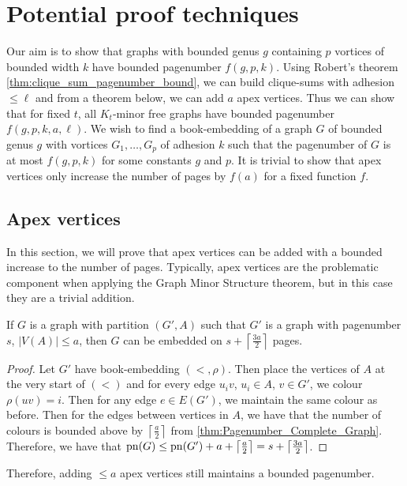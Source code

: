 
\chapter{Potential proof techniques}\label{chap:Proving_The_Theorem}
Our aim is to show that graphs with bounded genus \(g\) containing \(p\) vortices of bounded width \(k\) have bounded pagenumber \(f(g, p, k)\).
Using Robert's theorem \cref{thm:clique_sum_pagenumber_bound}, we can build clique-sums with adhesion \(\leq \ell\) and from a theorem below, we can add \(a\) apex vertices. 
Thus we can show that for fixed \(t\), all \(K_t\)-minor free graphs have bounded pagenumber \(f(g, p, k, a, \ell)\). 
We wish to find a book-embedding of a graph \(G\) of bounded genus \(g\) with vortices \(G_1, \ldots, G_p\) of adhesion \(k\) such that the pagenumber of \(G\) is at most \(f(g, p, k)\) for some constants \(g\) and \(p\). It is trivial to show that apex vertices only increase the number of pages by \(f(a)\) for a fixed function \(f\). 
\section{Apex vertices}
In this section, we will prove that apex vertices can be added with a bounded increase to the number of pages. Typically, apex vertices are the problematic component when applying the Graph Minor Structure theorem, but in this case they are a trivial addition.
\begin{theorem}\label{thm:apex_vertices_pagenumber}
	If \(G\) is a graph with partition \((G', A)\) such that \(G'\) is a graph with pagenumber \(s\), \(|V(A)| \leq a\), then \(G\) can be embedded on \(s + \left\lceil \frac{3a}{2}\right\rceil\) pages. 
\end{theorem}
\begin{proof}
	Let \(G'\) have book-embedding \((<, \rho)\). Then place the vertices of \(A\) at the very start of \((<)\) and for every edge \(u_i v \), \(u_i \in A\), \(v \in G'\), we colour \(\rho(uv) = i\). Then for any edge \(e \in E(G')\), we maintain the same colour as before. Then for the edges between vertices in \(A\), we have that the number of colours is bounded above by \(\left\lceil \frac{a}{2} \right\rceil\) from \cref{thm:Pagenumber_Complete_Graph}. Therefore, we have that \(\operatorname{pn}(G) \leq \operatorname{pn}(G') + a + \left\lceil \frac{a}{2} \right\rceil =s + \left\lceil \frac{3a}{2}\right\rceil\). 
\end{proof}

Therefore, adding \( \leq a\) apex vertices still maintains a bounded pagenumber.

